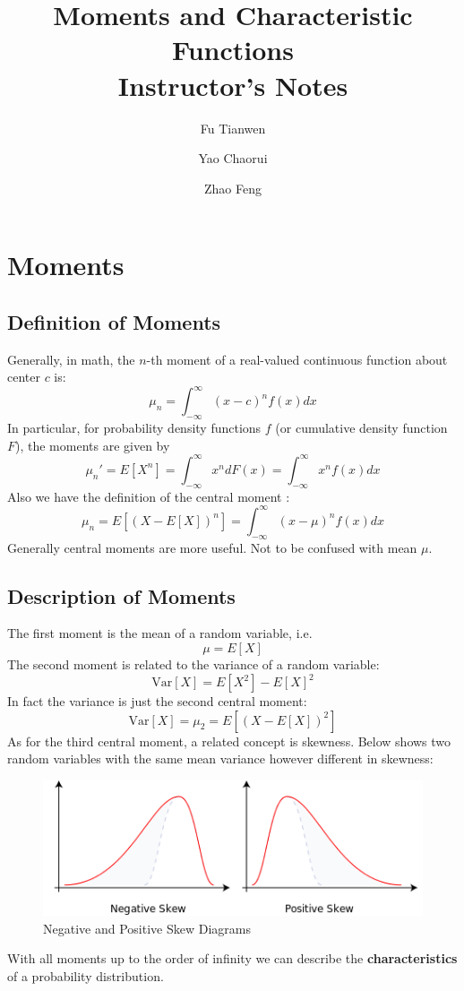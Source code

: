\documentclass{article}
\title{Moments and Characteristic Functions\\Instructor's Notes}
\author{Fu Tianwen \and Yao Chaorui \and Zhao Feng}
\theoremstyle{definition}
\theoremstyle{plain}
\theoremstyle{remark}
\begin{document}
	
\begin{titlepage}
	\maketitle
\end{titlepage}
\tableofcontents
\clearpage
\section{Moments}
\subsection{Definition of Moments}
Generally, in math, the $n$-th moment of a real-valued continuous function about center $c$ is: \cite{wiki:moment}
$$
\mu_n=\int_{-\infty}^\infty (x-c)^nf(x)dx
$$
In particular, for probability density functions $f$ (or cumulative density function $F$), the moments are given by
$$ \mu_n' = E[X^n] = \int_{-\infty}^\infty x^ndF(x) = \int_{-\infty}^\infty x^nf(x)dx $$
Also we have the definition of the central moment \cite{wiki:centralMoment}:
$$
\mu_n = E[(X-E[X])^n] = \int_{-\infty}^\infty (x-\mu)^nf(x)dx
$$
Generally central moments are more useful. Not to be confused with mean $\mu$.
\subsection{Description of Moments}
The first moment is the mean of a random variable, i.e. $$\mu=E[X]$$
The second moment is related to the variance of a random variable:
$$ \text{Var}[X] = E[X^2]-{E[X]}^2$$
In fact the variance is just the second central moment:
$$ \text{Var}[X] = \mu_2 = E[(X-E[X])^2]$$
As for the third central moment, a related concept is skewness. Below shows two random variables with the same mean variance however different in skewness\cite{wiki:skewness}:
\begin{figure}[H]
	\centering
	\includegraphics[width=0.8\linewidth]{img/Negative_and_positive_skew_diagrams_(English)}
	\caption{Negative and Positive Skew Diagrams} 
	\label{fig:skewness}
\end{figure}
With all moments up to the order of infinity we can describe the \textbf{characteristics} of a probability distribution.
\end{document}
